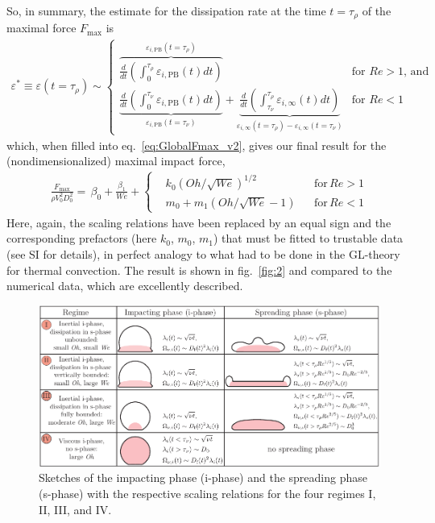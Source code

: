 \documentclass[preprint,amssymb,superscriptaddress,aps,prl,floatfix]{revtex4-1}
\begin{document}
So,  in summary, the estimate for the dissipation  rate at
the time $t = \tau_\rho$ 
of  the maximal force $F_\text{max}$ is 
\begin{align}\label{fmax} 
\varepsilon^* \equiv \varepsilon(t = \tau_\rho) \sim 
\begin{cases}
    \overbrace{\frac{d}{dt}\left(\int_0^{\tau_\rho}\varepsilon_{i,\text{PB}}(t) dt\right)}^{\varepsilon_{i,\text{PB}}(t = \tau_\rho)}
    & \text{for } Re > 1\text{, and} \\[4ex]
    \underbrace{\frac{d}{dt}\left(\int_0^{\tau_\nu}\varepsilon_{i,\text{PB}}(t) dt\right)}_{\varepsilon_{i,\text{PB}}(t = \tau_\nu)} + \underbrace{\frac{d}{dt}\left(\int_{\tau_\nu}^{\tau_\rho}\varepsilon_{i,\infty}(t) dt\right)}_{\varepsilon_{i,\infty}(t = \tau_\rho) - \varepsilon_{i,\infty}(t = \tau_\nu)}
    & \text{for } Re < 1
\end{cases}
\end{align}
which, when filled into  eq.\ \eqref{eq:GlobalFmax_v2}, gives our final
result for the (nondimensionalized) maximal impact force, 
\begin{align}
	\label{eq:FinalFmax}
	\frac{F_{\text{max}}}{\rho V_0^2D_0^2} =\, \beta_0 + \frac{\beta_1}{We} + \left\{ \begin{aligned} &k_0 \left(Oh/\sqrt{We}\right)^{1/2} && \text{for}\,Re > 1\\ &m_0 + m_1\left(Oh/\sqrt{We} - 1\right) && \text{for}\,Re < 1 \end{aligned} \right.
\end{align}
Here, again, the scaling relations have been replaced by an equal sign and the corresponding prefactors 
(here $k_0$, $m_0$, $m_1$) 
that 
must be fitted to trustable data (see SI for details), 
in perfect analogy to what had to be done
in the GL-theory for thermal convection. 
The result is shown in  fig.~\ref{fig:2} and compared to the 
numerical data, which are excellently described.

\begin{figure}
	\centering
	\includegraphics[width=\linewidth]{table1_v2-eps-converted-to.pdf}
	\caption{Sketches of the impacting phase (i-phase)
 and the spreading phase (s-phase) with the respective
 scaling relations for the four regimes I, II, III, and IV.  
 }
	\label{fig-table}
\end{figure}
\end{document}
